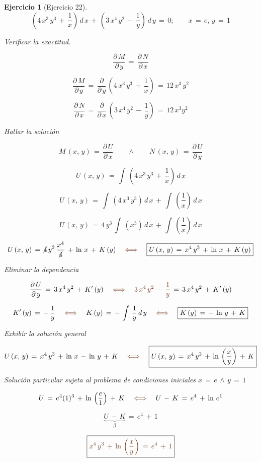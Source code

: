 \documentclass[a4paper,11pt]{book}
\newtheorem{ejer}{Ejercicio}[section]
\begin{document}
\begin{ejer}[Ejercicio 22] 

  $$\left(4\,x^{3}\,y^{3}\,+\,\dfrac{1}{x} \right)\,d\,x\,+\,\left(3\,x^{4}\,y^{2}\,-\,\dfrac{1}{y} \right)\,d\,y\,=\,0; \qquad x\,=\,e, \, y\,=\,1$$ 


 Verificar la exactitud. 

$$\dfrac{\partial\,M}{\partial\,y}\,=\,\dfrac{\partial\,N}{\partial\,x}$$ 

$$\dfrac{\partial\,M}{\partial\,y}\,=\,\dfrac{\partial}{\partial\,y}\,\left(4\,x^{3}\,y^{3}\,+\,\dfrac{1}{x} \right)\,=\,\boxed{12\,x^{3}\,y^{2}}$$ 

$$\dfrac{\partial\,N}{\partial\,x}\,=\,\dfrac{\partial}{\partial\,x}\,\left(3\,x^{4}\,y^{2}\,-\,\dfrac{1}{y} \right)\,=\,\boxed{12\,x^{3}y^{2}} $$ 

 Hallar la solución 

$$\boxed{M\,(x,\,y)\,=\,\dfrac{\partial\,U}{\partial\,x}} \qquad \wedge \qquad \boxed{N\,(x,\,y)\,=\,\dfrac{\partial\,U}{\partial\,y}}$$

$$U\,(x,\,y)\,=\,\int\,\left(4\,x^{3}\,y^{3}\,+\,\dfrac{1}{x} \right)\,d\,x$$ 

$$U\,(x,\,y)\,=\,\int\,\left(4\,x^{3}\,y^{3} \right)\,d\,x\,+\,\int\,\left(\dfrac{1}{x} \right)\,d\,x$$ 

$$U\,(x,\,y)\,=\,4\,y^{3}\,\int\,\left(x^{3} \right)\,d\,x\,+\,\int\,\left(\dfrac{1}{x} \right)\,d\,x $$ 

$$U\,(x,\,y)\,=\,\cancel{4}\,y^{3}\,\dfrac{x^{4}}{\cancel{4}}\,+\,\ln\,x\,+\,K\,(y) \quad \textcolor{auburn}{\iff} \quad \boxed{U\,(x,\,y)\,=\,x^{4}\,y^{3}\,+\,\ln\,x\,+\,K\,(y)} $$ 

 Eliminar la dependencia 

$$\dfrac{\partial\,U}{\partial\,y}\,=\, 3\,x^{4}\,y^{2}\,+\,K'\,(y) \quad \textcolor{auburn}{\iff} \quad \textcolor{auburn}{3\,x^{4}\,y^{2}\,-\,\dfrac{1}{y}}\,=\,3\,x^{4}\,y^{2}\,+\,K'\,(y)$$ 

$$K'\,(y)\,=\,-\,\dfrac{1}{y} \quad \textcolor{auburn}{\iff} \quad K\,(y)\,=\,-\,\int\,\dfrac{1}{y}\,d\,y \quad \textcolor{auburn}{\iff} \quad \boxed{K\,(y)\,=\,-\,\ln\,y\,+\,K}$$ 

 Exhibir la solución general  

$$U\,(x,\,y)\,=\,x^{4}\,y^{3}\,+\,\ln\,x\,-\,\ln\,y\,+\,K \quad \textcolor{auburn}{\iff} \quad \boxed{U\,(x,\,y)\,=\,x^{4}\,y^{3}\,+\,\ln\,\left(\dfrac{x}{y} \right)\,+\,K }$$ 

 Solución particular sujeta al problema de condiciones iniciales $\boxed{x\,=\,e \, \wedge \, y\,=\,1}$ 

$$U\,=\,e^{4}(1)^{3}\,+\,\ln\,\left(\dfrac{e}{1} \right)\,+\,K \quad \textcolor{auburn}{\iff} \quad U\,-\,K\,=\,e^{4}\,+\,\ln\,e^{1}$$ 

$$\underbrace{U\,-\,K}_{\beta}\,=\,e^{4}\,+\,1$$ 

$$\boxed{\textcolor{auburn}{x^{4}\,y^{3}\,+\,\ln\,\left(\dfrac{x}{y} \right)\,=\,e^{4}\,+\,1}} $$ 

\end{ejer} 
\end{document}
